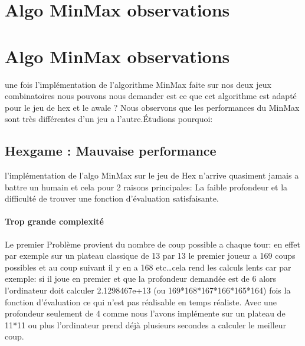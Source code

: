 \section{Algo MinMax observations}






\section{Algo MinMax observations}
une fois l'implémentation de l'algorithme MinMax faite sur nos deux
jeux combinatoires nous pouvons nous demander est ce que cet algorithme est adapté pour le jeu de hex et le awale ? Nous observons que les performances du MinMax sont très différentes d'un jeu a l'autre.Étudions pourquoi:

\subsection {Hexgame : Mauvaise performance}
l'implémentation de l'algo MinMax sur le jeu de Hex n'arrive quasiment jamais a battre un humain et cela pour 2 raisons principales: La faible profondeur et la difficulté de trouver une fonction d'évaluation satisfaisante.
\paragraph {Trop grande complexité} Le premier Problème provient du nombre de coup possible a chaque tour: en effet par exemple sur un plateau classique de 13 par 13 le premier joueur a 169 coups possibles et au coup suivant il y en a 168 etc\dots cela rend les calculs lents car par exemple: si il joue en premier et que la profondeur demandée est de 6 alors l'ordinateur doit calculer 2.1298467e+13 (ou 169*168*167*166*165*164) fois la fonction d'évaluation ce qui n'est pas réalisable en temps réaliste. Avec une profondeur seulement de 4 comme nous l'avons implémente sur un plateau de 11*11 ou plus l'ordinateur prend déjà plusieurs secondes a calculer le meilleur coup.

